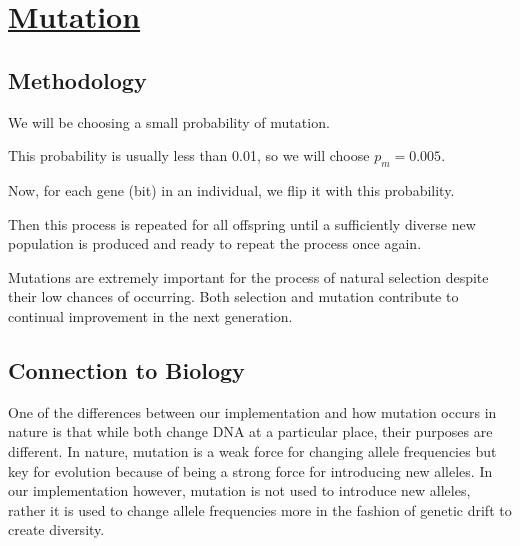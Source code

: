 \newpage
\section{\underline{Mutation}}

\subsection{Methodology}
We will be choosing a small probability of 
mutation.
\bi
\item This probability is usually less than 0.01, so we will choose
$p_m = 0.005$.
\item Now, for each gene (bit) in an individual, we flip it with this probability. 
\item Then this process is repeated for all offspring until a sufficiently diverse new population is produced and ready to repeat the process once again.
\item Mutations are extremely important for the process of natural selection despite their low chances of occurring. Both selection and mutation contribute to continual improvement in the next generation.
\ei

\subsection{Connection to Biology}
One of the differences between our implementation and how mutation 
occurs in nature is that while both change DNA at a particular place, their
purposes are different. In nature, mutation is a weak force for changing 
allele frequencies but key for evolution because of being a strong force
for introducing new alleles. In our implementation however, mutation is not
used to introduce new alleles, rather it is used to change allele frequencies
more in the fashion of genetic drift to create diversity.
